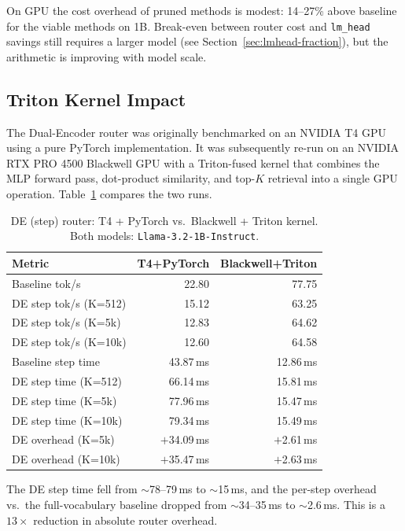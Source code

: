 \documentclass[twocolumn,10pt]{article}
\newcommand{\code}[1]{\texttt{#1}}
\newcommand{\tblhead}[1]{\textbf{#1}}
\begin{document}
On GPU the cost overhead of pruned methods is modest: 14--27\% above
baseline for the viable methods on 1B. Break-even between router cost and
\code{lm\_head} savings still requires a larger model (see
Section~\ref{sec:lmhead-fraction}), but the arithmetic is improving with
model scale.

\subsection{Triton Kernel Impact}
\label{sec:kernel}

The Dual-Encoder router was originally benchmarked on an NVIDIA T4 GPU using
a pure PyTorch implementation. It was subsequently re-run on an NVIDIA RTX PRO
4500 Blackwell GPU with a Triton-fused kernel that combines the MLP forward
pass, dot-product similarity, and top-$K$ retrieval into a single GPU
operation. Table~\ref{tab:kernel} compares the two runs.

\begin{table}[h]
\centering
\caption{DE (step) router: T4 + PyTorch vs.\ Blackwell + Triton kernel.
         Both models: \code{Llama-3.2-1B-Instruct}.}
\label{tab:kernel}
\footnotesize
\setlength{\tabcolsep}{4pt}
\begin{tabular}{@{}lrr@{}}
\toprule
\tblhead{Metric} & \tblhead{T4+PyTorch} & \tblhead{Blackwell+Triton} \\
\midrule
Baseline tok/s             & 22.80  & 77.75 \\
DE step tok/s (K=512)      & 15.12  & 63.25 \\
DE step tok/s (K=5k)       & 12.83  & 64.62 \\
DE step tok/s (K=10k)      & 12.60  & 64.58 \\
\midrule
Baseline step time         & 43.87\,ms & 12.86\,ms \\
DE step time (K=512)       & 66.14\,ms & 15.81\,ms \\
DE step time (K=5k)        & 77.96\,ms & 15.47\,ms \\
DE step time (K=10k)       & 79.34\,ms & 15.49\,ms \\
\midrule
DE overhead (K=5k)   & $+$34.09\,ms & $+$2.61\,ms \\
DE overhead (K=10k)  & $+$35.47\,ms & $+$2.63\,ms \\
\bottomrule
\end{tabular}
\end{table}

The DE step time fell from $\sim$78--79\,ms to $\sim$15\,ms, and the per-step
overhead vs.\ the full-vocabulary baseline dropped from $\sim$34--35\,ms to
$\sim$2.6\,ms. This is a $13\times$ reduction in absolute router overhead.
\end{document}
